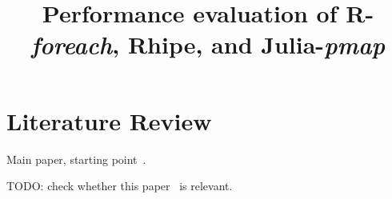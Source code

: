 \documentclass[a4paper,10pt]{paper}
\title{Performance evaluation of R-\emph{foreach}, Rhipe, and Julia-\emph{pmap}}
\begin{document}
\maketitle


\section{Literature Review}

Main paper, starting point~\cite{Kane2013}.

TODO: check whether this paper~\cite{Robert2010} is relevant.






\end{document}
